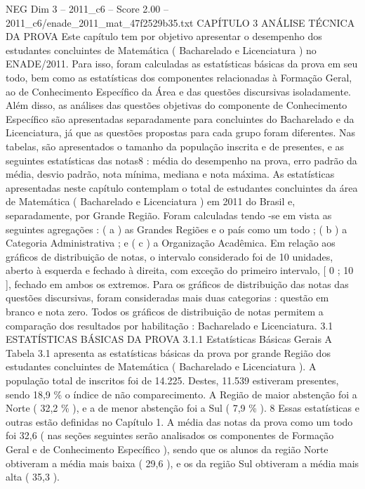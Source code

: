 \begin{textsample}{NEG Dim 3 – 2011\_c6 – Score 2.00 – 2011\_c6/enade\_2011\_mat\_47f2529b35.txt}  \label{ex:f3_neg_082}
CAPÍTULO 3 ANÁLISE TÉCNICA DA PROVA Este capítulo tem por objetivo apresentar o desempenho dos estudantes concluintes de Matemática ( Bacharelado e Licenciatura ) no ENADE/2011.
Para isso, foram calculadas as estatísticas básicas da prova em seu todo, bem como as estatísticas dos componentes relacionadas à Formação Geral, ao de Conhecimento Específico da Área e das questões discursivas isoladamente.
Além disso, as análises das questões objetivas do componente de Conhecimento Específico são apresentadas separadamente para concluintes do Bacharelado e da Licenciatura, já que as questões propostas para cada grupo foram diferentes.
Nas tabelas, são apresentados o tamanho da população inscrita e de presentes, e as seguintes estatísticas das notas8 : média do desempenho na prova, erro padrão da média, desvio padrão, nota mínima, mediana e nota máxima.
As estatísticas apresentadas neste capítulo contemplam o total de estudantes concluintes da área de Matemática ( Bacharelado e Licenciatura ) em 2011 do Brasil e, separadamente, por Grande Região.
Foram calculadas tendo -se em vista as seguintes agregações : ( a ) as Grandes Regiões e o país como um todo ; ( b ) a Categoria Administrativa ; e ( c ) a Organização Acadêmica.
Em relação aos gráficos de distribuição de notas, o intervalo considerado foi de 10 unidades, aberto à esquerda e fechado à direita, com exceção do primeiro intervalo, [ 0 ; 10 ], fechado em ambos os extremos.
Para os gráficos de distribuição das notas das questões discursivas, foram consideradas mais duas categorias : questão em branco e nota zero.
Todos os gráficos de distribuição de notas permitem a comparação dos resultados por habilitação : Bacharelado e Licenciatura. 3.1 ESTATÍSTICAS BÁSICAS DA PROVA 3.1.1 Estatísticas Básicas Gerais A Tabela 3.1 apresenta as estatísticas básicas da prova por grande Região dos estudantes concluintes de Matemática ( Bacharelado e Licenciatura ).
A população total de inscritos foi de 14.225.
Destes, 11.539 estiveram presentes, sendo 18,9 \% o índice de não comparecimento.
A Região de maior abstenção foi a Norte ( 32,2 \% ), e a de menor abstenção foi a Sul ( 7,9 \% ). 8 Essas estatísticas e outras estão definidas no Capítulo 1.
A média das notas da prova como um todo foi 32,6 ( nas seções seguintes serão analisados os componentes de Formação Geral e de Conhecimento Específico ), sendo que os alunos da região Norte obtiveram a média mais baixa ( 29,6 ), e os da região Sul obtiveram a média mais alta ( 35,3 ).

\end{textsample}
